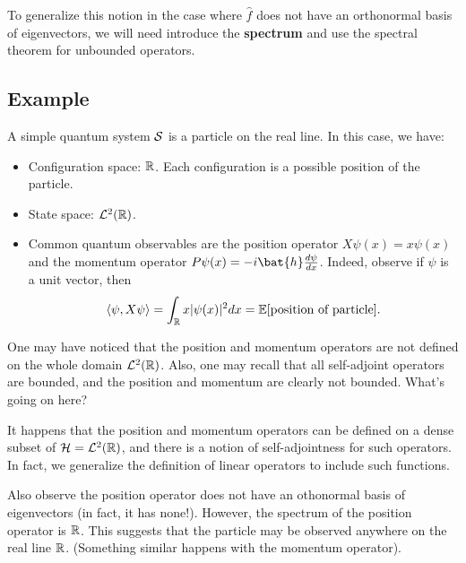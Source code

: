 To generalize this notion in the case where $\hat{f}$ does not have an orthonormal basis of eigenvectors, we will need introduce the \textbf{spectrum} and use the spectral theorem for unbounded operators.

\subsection{Example}
A simple quantum system ${\mathcal S}$ is a particle on the real line. In this case, we have:
\begin{itemize}
    \item Configuration space: ${\mathbb R}$. Each configuration is a possible position of the particle.
    \item State space: ${\mathcal L}^2({\mathbb R})$.
    \item Common quantum observables are the position operator $X\psi(x) = x\psi(x)$ and the momentum operator $P\psi(x) = -i\bat{h}\frac{d\psi}{dx}$. Indeed, observe if $\psi$ is a unit vector, then
    \[
        \langle \psi, X\psi \rangle = \int_{\mathbb R} x|\psi(x)|^2dx = \mathbb E[\text{position of particle}].
    \]
\end{itemize}
One may have noticed that the position and momentum operators are not defined on the whole domain ${\mathcal L}^2({\mathbb R})$. Also, one may recall that all self-adjoint operators are bounded, and the position and momentum are clearly not bounded. What's going on here?

It happens that the position and momentum operators can be defined on a dense subset of ${\mathcal H} = {\mathcal L}^2({\mathbb R})$, and there is a notion of self-adjointness for such operators. In fact, we generalize the definition of linear operators to include such functions.

Also observe the position operator does not have an othonormal basis of eigenvectors (in fact, it has none!). However, the spectrum of the position operator is ${\mathbb R}$. This suggests that the particle may be observed anywhere on the real line ${\mathbb R}$. (Something similar happens with the momentum operator).